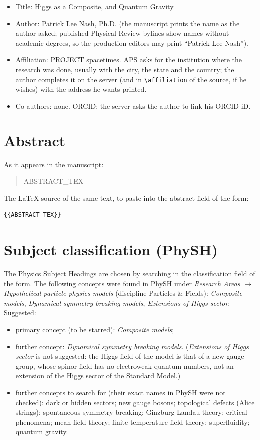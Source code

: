 \documentclass[11pt]{article}
\begin{document}
\begin{itemize}
\item Title: Higgs as a Composite, and Quantum Gravity
\item Author: Patrick Lee Nash, Ph.D. (the manuscript prints the name as the author asked; published Physical Review
bylines show names without academic degrees, so the production editors may print ``Patrick Lee Nash'').
\item Affiliation: PROJECT spacetimes. APS asks for the institution where the research was done, usually with the city,
the state and the country; the author completes it on the server (and in \texttt{\textbackslash affiliation} of the
source, if he wishes) with the address he wants printed.
\item Co-authors: none. ORCID: the server asks the author to link his ORCID iD.
\end{itemize}

\section{Abstract}
\label{sec:abstract}

As it appears in the manuscript:

\begin{quote}
{{ABSTRACT_TEX}}
\end{quote}

The LaTeX source of the same text, to paste into the abstract field of the form:

\begin{lstlisting}
{{ABSTRACT_TEX}}
\end{lstlisting}

\section{Subject classification (PhySH)}
\label{sec:physh}

The Physics Subject Headings are chosen by searching in the classification field of the form. The following concepts
were found in PhySH under \emph{Research Areas} $\to$ \emph{Hypothetical particle physics models} (discipline Particles
\& Fields): \emph{Composite models}, \emph{Dynamical symmetry breaking models}, \emph{Extensions of Higgs sector}. Suggested:
\begin{itemize}
\item primary concept (to be starred): \emph{Composite models};
\item further concept: \emph{Dynamical symmetry breaking models}. (\emph{Extensions of Higgs sector} is not suggested:
the Higgs field of the model is that of a new gauge group, whose spinor field has no electroweak quantum numbers, not an
extension of the Higgs sector of the Standard Model.)
\item further concepts to search for (their exact names in PhySH were not checked): dark or hidden sectors; new gauge
bosons; topological defects (Alice strings); spontaneous symmetry breaking; Ginzburg-Landau theory; critical phenomena;
mean field theory; finite-temperature field theory; superfluidity; quantum gravity.
\end{itemize}
\end{document}
